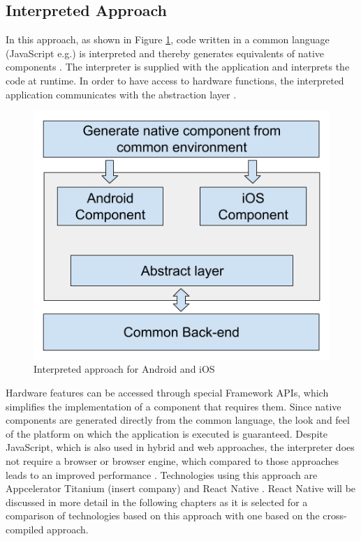 \documentclass[Bachelor,BIF,english]{twbook}
\begin{document}
\subsection{Interpreted Approach}
In this approach, as shown in Figure \ref{Fig3}, code written in a common language (JavaScript e.g.) is interpreted and thereby generates equivalents of native components \cite[p.~3]{7479278}. The interpreter is supplied with the application and interprets the code at runtime. In order to have access to hardware functions, the interpreted application communicates with the abstraction layer \cite[p.~3]{7479278} \cite[p.~2]{7934674}.
\begin{figure}[!htbp]
\centering
\includegraphics[width=0.5\linewidth]{PICs/Interpreted.png}
\caption{Interpreted approach for Android and iOS \cite[p.~3]{7479278}}\label{Fig3}
\end{figure}
Hardware features can be accessed through special Framework APIs, which simplifies the implementation of a component that requires them. Since native components are generated directly from the common language, the look and feel of the platform on which the application is executed is guaranteed. Despite JavaScript, which is also used in hybrid and web approaches, the interpreter does not require a browser or browser engine, which compared to those approaches leads to an improved performance \cite[p.~627]{6420693} \cite[p.~3]{7479278}. Technologies using this approach are Appcelerator Titanium (insert company) and React Native \cite[p.~2]{7934674} \cite[p.~3]{JohanssonSderberg2018}. React Native will be discussed in more detail in the following chapters as it is selected for a comparison of technologies based on this approach with one based on the cross-compiled approach.
\end{document}

